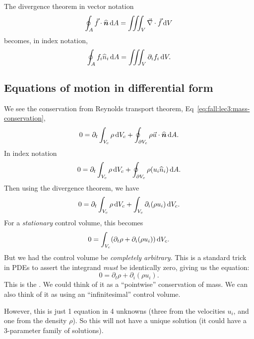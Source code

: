 \begin{example}
The divergence theorem in vector notation
\begin{equation}
\oint_{A}\vec{f}\cdot\widehat{\boldsymbol{n}}\,\mathrm{d} A =
\iiint_{V}\vec{\nabla}\cdot\vec{f}\,\mathrm{d} V
\end{equation}
becomes, in index notation,
\begin{equation}
\oint_{A}f_{i}\widehat{n}_{i}\,\mathrm{d} A =
\iiint_{V}\partial_{i}f_{i}\,\mathrm{d} V.
\end{equation}
\end{example}

\subsection{Equations of motion in differential form}

\begin{node}
We see the conservation from Reynolds transport theorem, Eq~\eqref{eq:fall:lec3:mass-conservation},
\begin{equation}
0=\partial_{t}\int_{V_{c}}\rho\,\mathrm{d} V_{c}+\oint_{\partial V_{c}}\rho\vec{u}\cdot\widehat{\boldsymbol{n}}\,\mathrm{d} A.
\end{equation}
In index notation
\begin{equation}
0=\partial_{t}\int_{V_{c}}\rho\,\mathrm{d} V_{c}+\oint_{\partial V_{c}}\rho(u_{i}\widehat{n}_{i})\,\mathrm{d} A.
\end{equation}
Then using the divergence theorem, we have
\begin{equation}
0=\partial_{t}\int_{V_{c}}\rho\,\mathrm{d} V_{c}+\int_{V_{c}}\partial_{i}(\rho u_{i})\,\mathrm{d} V_{c}.
\end{equation}
For a \emph{stationary} control volume, this becomes
\begin{equation}
0=\int_{V_{c}}(\partial_{t}\rho + \partial_{i}(\rho u_{i}))\,\mathrm{d} V_{c}.
\end{equation}
But we had the control volume be \emph{completely arbitrary}. This is
a standard trick in PDEs to assert the integrand \emph{must} be
identically zero, giving us the equation:
\begin{equation}
0=\partial_{t}\rho + \partial_{i}(\rho u_{i}).
\end{equation}
This is the . We could think of it as a
``pointwise'' conservation of mass. We can also think of it as using
an ``infinitesimal'' control volume.

However, this is just 1 equation in 4 unknowns (three from the
velocities $u_{i}$, and one from the density $\rho$). So this will not
have a unique solution (it could have a 3-parameter family of solutions).
\end{node}

